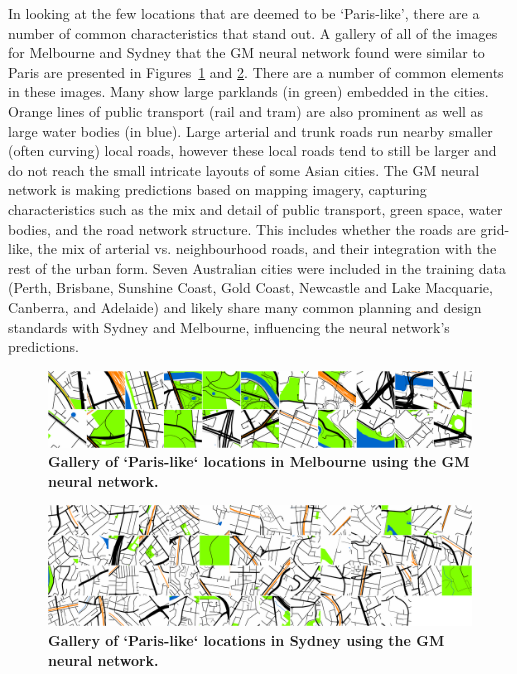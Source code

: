 \documentclass[Crown,sageh,times]{sagej}
\begin{document}
In looking at the few locations that are deemed to be `Paris-like', there are a number of common characteristics that stand out. A gallery of all of the images for Melbourne and Sydney that the GM neural network found were similar to Paris are presented in Figures~\ref{fig:gm_mel_gallery} and \ref{fig:gm_syd_gallery}. There are a number of common elements in these images. Many show large parklands (in green) embedded in the cities. Orange lines of public transport (rail and tram) are also prominent as well as large water bodies (in blue). Large arterial and trunk roads run nearby smaller (often curving) local roads, however these local roads tend to still be larger and do not reach the small intricate layouts of some Asian cities. The GM neural network is making predictions based on mapping imagery, capturing characteristics such as the mix and detail of public transport, green space, water bodies, and the road network structure. This includes whether the roads are grid-like, the mix of arterial vs. neighbourhood roads, and their integration with the rest of the urban form. Seven Australian cities were included in the training data (Perth, Brisbane, Sunshine Coast, Gold Coast, Newcastle and Lake Macquarie, Canberra, and Adelaide) and likely share many common planning and design standards with Sydney and Melbourne, influencing the neural network's predictions. 

\begin{figure}[!htbp]
\centering   
\includegraphics[scale=0.10]{Images/Figure7MelMaps.png}   
\caption{\bf Gallery of `Paris-like` locations in Melbourne using the GM neural network.}    
 \label{fig:gm_mel_gallery} 
\end{figure} 


\begin{figure}[!htbp]
\centering   
\includegraphics[scale=0.11]{Images/Figure8SydMaps.png}   
\caption{\bf Gallery of `Paris-like` locations in Sydney using the GM neural network.}    
 \label{fig:gm_syd_gallery}  
\end{figure} 
\end{document}
